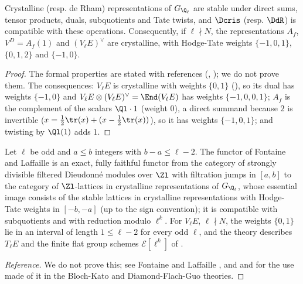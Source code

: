 \begin{proposition}[stability]\label{prop:blochkato:crystalline-closure}
Crystalline (resp. de Rham) representations of $G_{\Q_\ell}$ are stable under direct sums, tensor products, duals, subquotients and Tate twists, and $\Dcris$
(resp. $\DdR$) is compatible with these operations. Consequently, if $\ell\nmid N$, the representations $A_f$, $V^D=A_f(1)$ and $(V_\ell E)^\vee$ are crystalline,
with Hodge-Tate weights $\{-1,0,1\}$, $\{0,1,2\}$ and $\{-1,0\}$.
\end{proposition}

\begin{proof}
The formal properties are stated with references (\cite{Fontaine}, \cite[Section 2]{Berger}); we do not prove them. The consequences: $V_\ell E$ is crystalline
with weights $\{0,1\}$ (), so its dual has weights $\{-1,0\}$ and $V_\ell E\otimes(V_\ell E)^\vee=\End(V_\ell E)$ has weights
$\{-1,0,0,1\}$; $A_f$ is the complement of the scalars $\Ql\cdot1$ (weight $0$), a direct summand because $2$ is invertible ($x=\tfrac12\tr(x)+(x-\tfrac12\tr(x))$),
so it has weights $\{-1,0,1\}$; and twisting by $\Ql(1)$ adds $1$.
\end{proof}

\begin{theorem}\label{thm:blochkato:fontaine-laffaille}
Let $\ell$ be odd and $a\le b$ integers with $b-a\le\ell-2$. The functor of Fontaine and Laffaille is an exact, fully faithful functor from the category of
strongly divisible filtered Dieudonn\'e modules over $\Zl$ with filtration jumps in $[a,b]$ to the category of $\Zl$-lattices in crystalline representations of $G_{\Q_\ell}$,
whose essential image consists of the stable lattices in crystalline representations with Hodge-Tate weights in $[-b,-a]$ (up to the sign convention); it is
compatible with subquotients and with reduction modulo $\ell^k$. For $V_\ell E$, $\ell\nmid N$, the weights $\{0,1\}$ lie in an interval of length $1\le\ell-2$ for every odd
$\ell$, and the theory describes $T_\ell E$ and the finite flat group schemes $\mathcal E[\ell^k]$ of .
\end{theorem}

\begin{proof}[Reference]
We do not prove this; see Fontaine and Laffaille \cite{FontaineLaffaille}, and \cite[Section 4]{BlochKato} and \cite[Sections 1 and 2]{DFG04} for the use made of
it in the Bloch-Kato and Diamond-Flach-Guo theories.
\end{proof}


